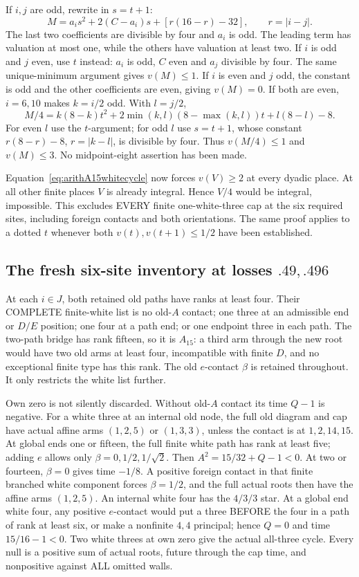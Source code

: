If \(i,j\) are odd, rewrite in \(s=t+1\):
\[
 M=a_is^2+2(C-a_i)s+[r(16-r)-32],\qquad r=|i-j|.
\]
The last two coefficients are divisible by four and \(a_i\)
is odd.  The leading term has valuation at most one, while
the others have valuation at least two.
If \(i\) is odd and \(j\) even, use \(t\) instead:
\(a_i\) is odd, \(C\) even and \(a_j\) divisible by four.
The same unique-minimum argument gives \(v(M)\le1\).
If \(i\) is even and \(j\) odd, the constant is odd and the
other coefficients are even, giving \(v(M)=0\).
If both are even, \(i=6,10\) makes \(k=i/2\) odd.
With \(l=j/2\),
\[
 M/4=k(8-k)t^2+2\min(k,l)(8-\max(k,l))t+l(8-l)-8 .
\]
For even \(l\) use the \(t\)-argument; for odd \(l\) use
\(s=t+1\), whose constant
\(r(8-r)-8\), \(r=|k-l|\), is divisible by four.
Thus \(v(M/4)\le1\) and \(v(M)\le3\).
No midpoint-eight assertion has been made.

Equation~\eqref{eq:arithA15whitecycle} now forces \(v(V)\ge2\)
at every dyadic place.
At all other finite places \(V\) is already integral.
Hence \(V/4\) would be integral, impossible.
This excludes EVERY finite one-white-three cap at the six
required sites, including foreign contacts and both orientations.
The same proof applies to a dotted \(t\) whenever both
\(v(t),v(t+1)\le1/2\) have been established.

\subsection{The fresh six-site inventory at losses \(.49,.496\)}
\label{app:arithA15freshinventory}

At each \(i\in J\), both retained old paths have ranks at
least four.
Their COMPLETE finite-white list is no old-\(A\) contact;
one three at an admissible end or \(D/E\) position;
one four at a path end; or one endpoint three in each path.
The two-path bridge has rank fifteen, so it is \(A_{15}\):
a third arm through the new root would have two old arms at
least four, incompatible with finite \(D\), and no exceptional
finite type has this rank.
The old \(e\)-contact \(\beta\) is retained throughout.
It only restricts the white list further.

Own zero is not silently discarded.
Without old-\(A\) contact its time \(Q-1\) is negative.
For a white three at an internal old node, the full old diagram
and cap have actual affine arms \((1,2,5)\) or \((1,3,3)\),
unless the contact is at \(1,2,14,15\).
At global ends one or fifteen, the full finite white path
has rank at least five; adding \(e\) allows only
\(\beta=0,1/2,1/\sqrt2\).
Then \(A^2=15/32+Q-1<0\).
At two or fourteen, \(\beta=0\) gives time \(-1/8\).
A positive foreign contact in that finite branched white
component forces \(\beta=1/2\), and the full actual roots
then have the affine arms \((1,2,5)\).
An internal white four has the \(4/3/3\) star.
At a global end white four, any positive \(e\)-contact would
put a three BEFORE the four in a path of rank at least six,
or make a nonfinite \(4,4\) principal; hence \(Q=0\) and
time \(15/16-1<0\).
Two white threes at own zero give the actual all-three cycle.
Every null is a positive sum of actual roots, future through
the cap time, and nonpositive against ALL omitted walls.

